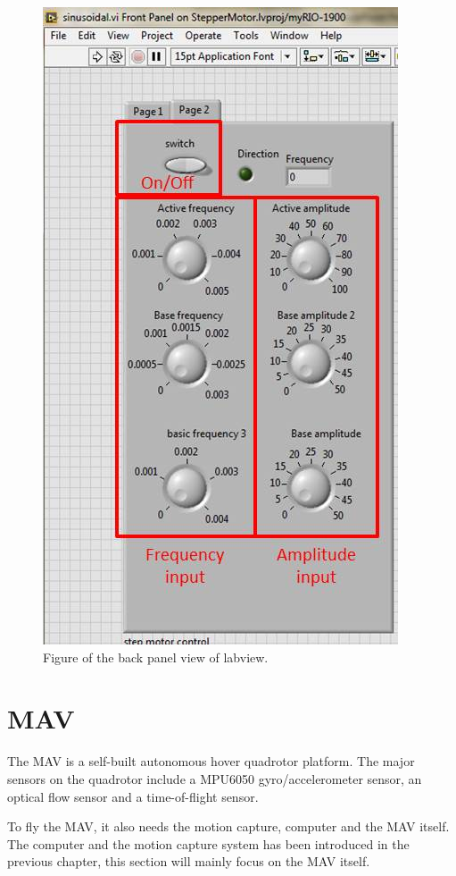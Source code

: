 \documentclass[idxtotoc,hyperref,openany]{labbook} %
\begin{document}
\begin{figure}[h!]
\centering
\includegraphics[scale=0.5]{./Figure/fig_labviewback}
\caption{Figure of the back panel view of labview.}\label{fig_labviewback}
\end{figure}


\chapter{MAV}
The MAV is a self-built autonomous hover quadrotor platform. The major sensors on the quadrotor include a MPU6050 gyro/accelerometer sensor, an optical flow sensor and a time-of-flight sensor. 


To fly the MAV, it also needs the motion capture, computer and the MAV itself. The computer and the motion capture system has been introduced in the previous chapter, this section will mainly focus on the MAV itself. 
\end{document}
